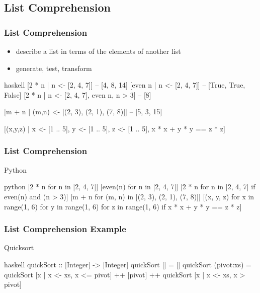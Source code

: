 \documentclass[dvipsnames]{beamer}
\theoremstyle{plain}
\begin{document}
\subsection{List Comprehension}

\begin{frame}[fragile]
  \frametitle{List Comprehension}

  \begin{itemize}
    \item describe a list in terms of the elements of another list
    \item generate, test, transform
  \end{itemize}

  \begin{exampleblock}{}
    \begin{pygments}{haskell}
[2 * n | n <- [2, 4, 7]]  -- [4, 8, 14]
[even n | n <- [2, 4, 7]] -- [True, True, False]
[2 * n | n <- [2, 4, 7], even n, n > 3]  -- [8]

[m + n | (m,n) <- [(2, 3), (2, 1), (7, 8)]]
-- [5, 3, 15]

[(x,y,z) | x <- [1 .. 5],
           y <- [1 .. 5],
           z <- [1 .. 5],
           x * x + y * y == z * z]
    \end{pygments}
  \end{exampleblock}
\end{frame}

\begin{frame}[fragile]
  \frametitle{List Comprehension}

  \begin{exampleblock}{Python}
    \begin{pygments}{python}
[2 * n for n in [2, 4, 7]]
[even(n) for n in [2, 4, 7]]
[2 * n for n in [2, 4, 7] if even(n) and (n > 3)]
[m + n for (m, n) in [(2, 3), (2, 1), (7, 8)]]
[(x, y, z) for x in range(1, 6)
           for y in range(1, 6)
           for z in range(1, 6)
           if x * x + y * y == z * z]
    \end{pygments}
  \end{exampleblock}
\end{frame}

\begin{frame}[fragile]
  \frametitle{List Comprehension Example}

  \begin{exampleblock}{Quicksort}
    \begin{pygments}{haskell}
quickSort :: [Integer] -> [Integer]
quickSort [] = []
quickSort (pivot:xs) =
    quickSort [x | x <- xs, x <= pivot]
    ++ [pivot]
    ++ quickSort [x | x <- xs, x > pivot]
    \end{pygments}
  \end{exampleblock}
\end{frame}
\end{document}
